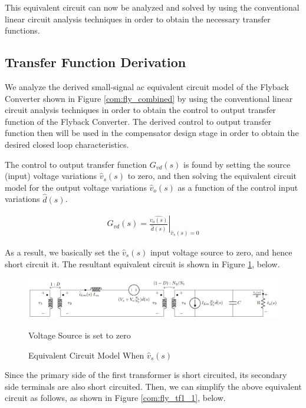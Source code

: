 This equivalent circuit can now be analyzed and solved by using the conventional linear circuit analysis techniques in order to obtain the necessary transfer functions.

\subsection{Transfer Function Derivation}

We analyze the derived small-signal ac equivalent circuit model of the Flyback Converter shown in Figure \ref{com:fly_combined} by using the conventional linear circuit analysis techniques in order to obtain the control to output transfer function of the Flyback Converter. The derived control to output transfer function then will be used in the compensator design stage in order to obtain the desired closed loop characteristics.

The control to output transfer function $G_{vd}(s)$ is found by setting the source (input) voltage variations $\hat{v}_s(s)$ to zero, and then solving the equivalent circuit model for the output voltage variations $\hat{v}_o(s)$ as a function of the control input variations $\hat{d}(s)$.

\begin{align}
   \left. G_{vd}(s) = \frac{\hat{v_o(s)}}{\hat{d}(s)}\right \vert_{\hat{v}_s(s) = 0}
\end{align}

As a result, we basically set the $\hat{v}_s(s)$ input voltage source to zero, and hence short circuit it. The resultant equivalent circuit is shown in Figure \ref{com:fly_tf1}, below.

\begin{figure}[H]
\begin{center}
\includegraphics[width=1\textwidth]{Compensator/flyback_tf1.png}
\caption{Equivalent Circuit Model When $\hat{v}_s(s)$} Voltage Source is set to zero
\label{com:fly_tf1}
\end{center}
\end{figure}

Since the primary side of the first transformer is short circuited, its secondary side terminals are also short circuited. Then, we can simplify the above equivalent circuit as follows, as shown in Figure \ref{com:fly_tf1_1}, below.

